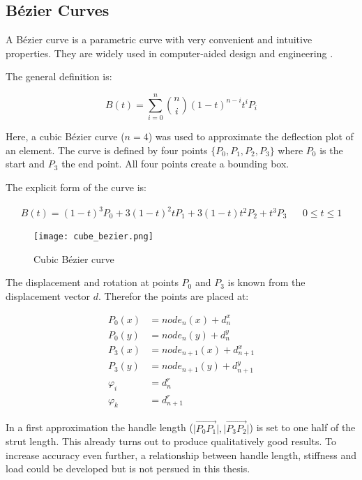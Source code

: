 \subsection{B\'{e}zier Curves}
\label{subsec:bezier}

A B\'{e}zier curve is a parametric curve with very convenient and intuitive properties. They are widely used in computer-aided design and engineering \cite[1.3]{beziercad} \cite[3.-5.]{bezier}.

The general definition is:

\begin{equation} \label{generalBezier}
B(t) = \sum\limits_{i=0}^n \binom{n}{i} (1-t)^{n-i} t^{i} P_i
\end{equation}

Here, a cubic B\'{e}zier curve ($n=4$) was used to approximate the deflection plot of an element. The curve is defined by four points $\{P_0, P_1, P_2, P_3\}$ where $P_0$ is the start and $P_3$ the end point. All four points create a bounding box.

The explicit form of the curve is:

\begin{align*} \label{cubeBezier}
B(t) = (1-t)^3 P_0 + 3 (1-t)^2 t P_1 + 3 (1-t) t^2 P_2 + t^3 P_3 && 0 \leq t \leq 1
\end{align*}

\begin{figure}[h]%
    \centering
    \texttt{[image: cube\_bezier.png]}%
    \caption{Cubic B\'{e}zier curve}%
    \label{fig:cubeBezier}%
\end{figure}

The displacement and rotation at points $P_0$ and $P_3$ is known from the displacement vector $d$. Therefor the points are placed at:

\begin{equation*} \label{bezierHandles}
\begin{aligned}
P_0(x) &= node_n(x) + d_n^x \\
P_0(y) &= node_n(y) + d_n^y \\
P_3(x) &= node_{n+1}(x) + d_{n+1}^x \\
P_3(y) &= node_{n+1}(y) + d_{n+1}^y \\
\varphi_i &= d_n^r \\
\varphi_k &= d_{n+1}^r
\end{aligned}
\end{equation*}

In a first approximation the handle length ($\lvert\overrightarrow{P_0P_1}\lvert , \lvert\overrightarrow{P_3P_2}\lvert$) is set to one half of the strut length. This already turns out to produce qualitatively good results.
To increase accuracy even further, a relationship between handle length, stiffness and load could be developed but is not persued in this thesis. 

